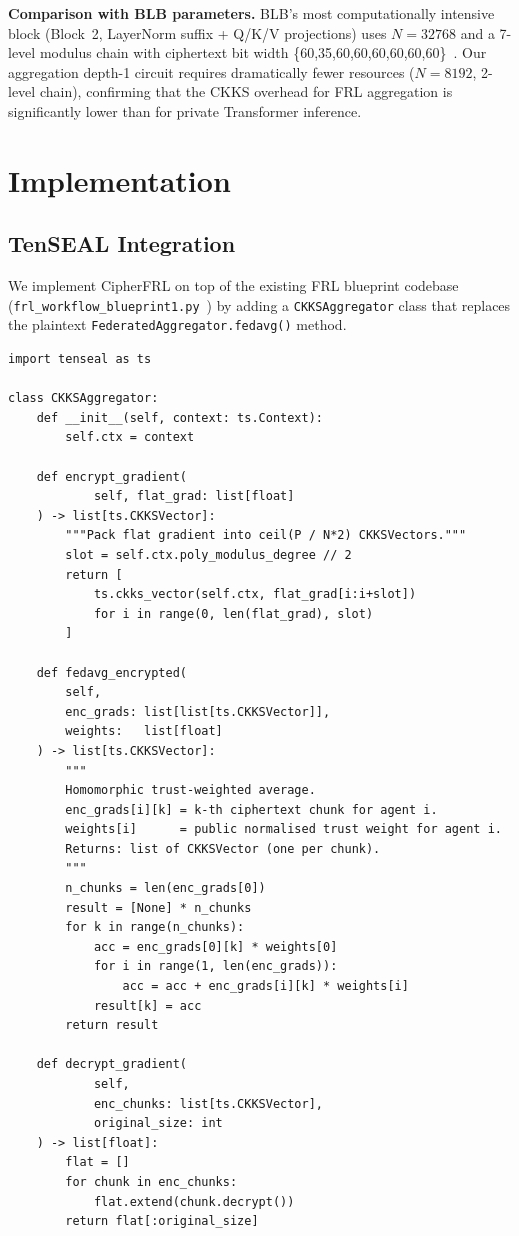 \documentclass[letterpaper,journal]{IEEEtran}
\begin{document}
\textbf{Comparison with BLB parameters.}
BLB's most computationally intensive block (Block~2, LayerNorm suffix +
Q/K/V projections) uses $N = 32768$ and a 7-level modulus chain with
ciphertext bit width \{60,35,60,60,60,60,60,60\}~\cite{blb2025}.
Our aggregation depth-1 circuit requires dramatically fewer resources
($N = 8192$, 2-level chain), confirming that the CKKS overhead for FRL
aggregation is significantly lower than for private Transformer inference.

\section{Implementation}\label{sec:implementation}

\subsection{TenSEAL Integration}

We implement CipherFRL on top of the existing FRL blueprint codebase
(\texttt{frl\_workflow\_blueprint1.py}~\cite{frlconf2026}) by adding a
\texttt{CKKSAggregator} class that replaces the plaintext
\texttt{FederatedAggregator.fedavg()} method.

\begin{verbatim}
import tenseal as ts

class CKKSAggregator:
    def __init__(self, context: ts.Context):
        self.ctx = context

    def encrypt_gradient(
            self, flat_grad: list[float]
    ) -> list[ts.CKKSVector]:
        """Pack flat gradient into ceil(P / N*2) CKKSVectors."""
        slot = self.ctx.poly_modulus_degree // 2
        return [
            ts.ckks_vector(self.ctx, flat_grad[i:i+slot])
            for i in range(0, len(flat_grad), slot)
        ]

    def fedavg_encrypted(
        self,
        enc_grads: list[list[ts.CKKSVector]],
        weights:   list[float]
    ) -> list[ts.CKKSVector]:
        """
        Homomorphic trust-weighted average.
        enc_grads[i][k] = k-th ciphertext chunk for agent i.
        weights[i]      = public normalised trust weight for agent i.
        Returns: list of CKKSVector (one per chunk).
        """
        n_chunks = len(enc_grads[0])
        result = [None] * n_chunks
        for k in range(n_chunks):
            acc = enc_grads[0][k] * weights[0]
            for i in range(1, len(enc_grads)):
                acc = acc + enc_grads[i][k] * weights[i]
            result[k] = acc
        return result

    def decrypt_gradient(
            self,
            enc_chunks: list[ts.CKKSVector],
            original_size: int
    ) -> list[float]:
        flat = []
        for chunk in enc_chunks:
            flat.extend(chunk.decrypt())
        return flat[:original_size]
\end{verbatim}
\end{document}
